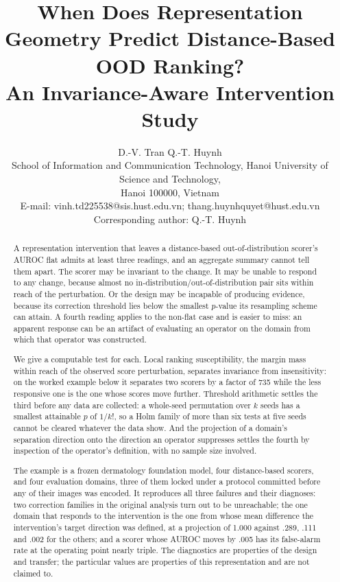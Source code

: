\documentclass[11pt,a4paper]{article}
\begin{document}
\title{When Does Representation Geometry Predict Distance-Based OOD Ranking?\\
An Invariance-Aware Intervention Study}

\author{D.-V. Tran \quad Q.-T. Huynh\\[0.5em]
\small School of Information and Communication Technology, Hanoi University of Science and Technology,\\
\small Hanoi 100000, Vietnam\\
\small E-mail: vinh.td225538@sis.hust.edu.vn; thang.huynhquyet@hust.edu.vn\\
\small Corresponding author: Q.-T. Huynh}
\date{}

\maketitle

\begin{abstract}
A representation intervention that leaves a distance-based out-of-distribution
scorer's AUROC flat admits at least three readings, and an aggregate summary
cannot tell them apart. The scorer may be invariant to the change. It may be
unable to respond to any change, because almost no in-distribution/out-of-distribution
pair sits within reach of the perturbation. Or the design may be incapable of
producing evidence, because its correction threshold lies below the smallest
$p$-value its resampling scheme can attain. A fourth reading applies to the
non-flat case and is easier to miss: an apparent response can be an artifact of
evaluating an operator on the domain from which that operator was constructed.

We give a computable test for each. Local ranking susceptibility, the margin
mass within reach of the observed score perturbation, separates invariance from
insensitivity: on the worked example below it separates two scorers by a factor
of 735 while the less responsive one is the one whose scores move further.
Threshold arithmetic settles the third before any data are collected: a
whole-seed permutation over $k$ seeds has a smallest attainable $p$ of $1/k!$,
so a Holm family of more than six tests at five seeds cannot be cleared
whatever the data show. And the projection of a domain's separation direction
onto the direction an operator suppresses settles the fourth by inspection of
the operator's definition, with no sample size involved.

The example is a frozen dermatology foundation model, four distance-based
scorers, and four evaluation domains, three of them locked under a protocol
committed before any of their images was encoded. It reproduces all three
failures and their diagnoses: two correction families in the original analysis
turn out to be unreachable; the one domain that responds to the intervention
is the one from whose mean difference the intervention's target direction was
defined, at a projection of 1.000 against .289, .111 and .002 for the others;
and a scorer whose AUROC moves by .005 has its false-alarm rate at the
operating point nearly triple. The diagnostics are properties of the design and
transfer; the particular values are properties of this representation and are
not claimed to.
\end{abstract}
\end{document}
